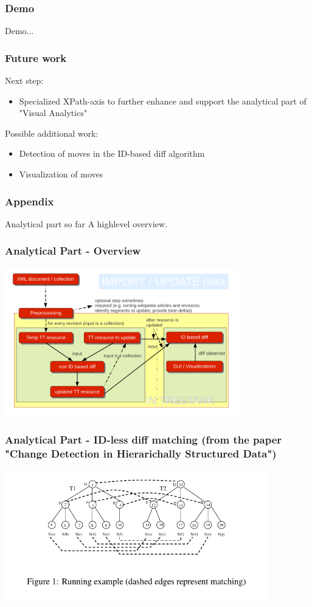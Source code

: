 \documentclass{beamer}
\begin{document}
\begin{frame}
\frametitle{Demo}
Demo...
\end{frame}

\begin{frame}
\frametitle{Future work}
Next step:

\begin{itemize}
\item Specialized XPath-axis to further enhance and support the analytical part of "Visual Analytics"
\end{itemize}

Possible additional work:

\begin{itemize}
\item Detection of moves in the ID-based diff algorithm
\item Visualization of moves
\end{itemize}
\end{frame}

\begin{frame}
\frametitle{Appendix}
\begin{block}{\centering Analytical part so far}
\centering A highlevel overview.
\end{block}
\end{frame}

\begin{frame}
\frametitle{Analytical Part - Overview}
\begin{center}
\includegraphics[width=4.0in]{images/importdata.pdf}
\end{center}
\end{frame}

\begin{frame}
\frametitle{Analytical Part - ID-less diff matching (from the paper "Change Detection in Hierarichally Structured Data")}
\begin{center}
\includegraphics[width=4.5in]{images/matching.pdf}
\end{center}
\end{frame}
\end{document}
